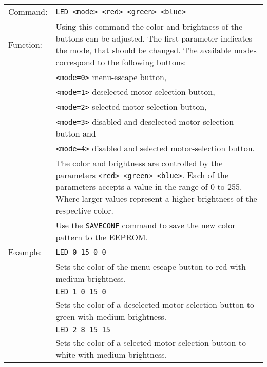 \begin{table}[!htbp]
  \begin{tabularx}{\textwidth}{lX}
    Command:  & \texttt{LED <mode> <red> <green> <blue>}\\
    Function: & Using this command the color and brightness of the buttons can be adjusted. The first parameter indicates the mode, that should be changed. The available modes correspond to the following buttons:\\
              & \texttt{<mode=0>} menu-escape button, \\
              & \texttt{<mode=1>} deselected motor-selection button, \\
              & \texttt{<mode=2>} selected motor-selection button, \\
              & \texttt{<mode=3>} disabled and deselected motor-selection button and \\
              & \texttt{<mode=4>} disabled and selected motor-selection button. \\
              & The color and brightness are controlled by the parameters \texttt{<red> <green> <blue>}. Each of the parameters accepts a value in the range of 0 to 255. Where larger values represent a higher brightness of the respective color.\\
              & Use the \texttt{SAVECONF} command to save the new color pattern to the EEPROM.\\
    Example:  & \texttt{LED 0 15 0 0}\\
              & Sets the color of the menu-escape button to red with medium brightness.\\
              & \texttt{LED 1 0 15 0}\\
              & Sets the color of a deselected motor-selection button to green with medium brightness.\\
              & \texttt{LED 2 8 15 15}\\
              & Sets the color of a selected motor-selection button to white with medium brightness.
  \end{tabularx}
\end{table}

\vspace{\vdistace}

